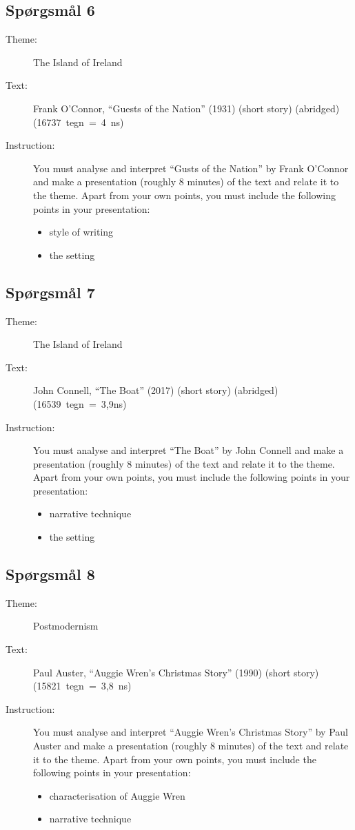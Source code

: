 \documentclass[10pt,a4paper]{article}
\begin{document}
\subsection{Spørgsmål 6}
\begin{description}
\item[Theme:] The Island of Ireland
\item[Text:] Frank O'Connor, “Guests of the Nation” (1931) (short story) (abridged) (16737~tegn~=~4~ns)
\item[Instruction:] You must analyse and interpret “Gusts of the Nation” by Frank O'Connor and make a presentation (roughly 8 minutes) of the text and relate it to the theme. Apart from your own points, you must include the following points in your presentation:
\begin{itemize}
\item style of writing
\item the setting
\end{itemize}
\end{description}

\subsection{Spørgsmål 7}
\begin{description}
\item[Theme:] The Island of Ireland
\item[Text:] John Connell, “The Boat” (2017) (short story) (abridged) (16539~tegn~=~3,9ns)
\item[Instruction:] You must analyse and interpret “The Boat” by John Connell and make a presentation (roughly 8 minutes) of the text and relate it to the theme. Apart from your own points, you must include the following points in your presentation:
\begin{itemize}
\item narrative technique
\item the setting
\end{itemize}
\end{description}

\subsection{Spørgsmål 8}
\begin{description}
\item[Theme:] Postmodernism
\item[Text:] Paul Auster, “Auggie Wren's Christmas Story” (1990) (short story) (15821~tegn~=~3,8~ns)
\item[Instruction:] You must analyse and interpret “Auggie Wren's Christmas Story” by Paul Auster and make a presentation (roughly 8 minutes) of the text and relate it to the theme. Apart from your own points, you must include the following points in your presentation:
\begin{itemize}
\item characterisation of Auggie Wren
\item narrative technique
\end{itemize}
\end{description}
\end{document}
